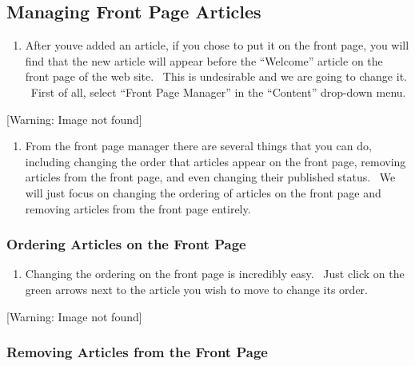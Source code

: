 \documentclass[12pt,twoside]{article}
\newcounter{saveenum}
\newcommand\liststyleLiii{%
\renewcommand\theenumi{\arabic{enumi}}
\renewcommand\theenumii{\arabic{enumii}}
\renewcommand\theenumiii{\arabic{enumiii}}
\renewcommand\theenumiv{\arabic{enumiv}}
\renewcommand\labelenumi{3.\theenumi)}
\renewcommand\labelenumii{\theenumii.}
\renewcommand\labelenumiii{\theenumiii.}
\renewcommand\labelenumiv{\theenumiv.}
}
\newcommand\liststyleLiv{%
\renewcommand\theenumi{\arabic{enumi}}
\renewcommand\theenumii{\arabic{enumii}}
\renewcommand\theenumiii{\arabic{enumiii}}
\renewcommand\theenumiv{\arabic{enumiv}}
\renewcommand\labelenumi{3.\theenumi)}
\renewcommand\labelenumii{\theenumii.}
\renewcommand\labelenumiii{\theenumiii.}
\renewcommand\labelenumiv{\theenumiv.}
}
\begin{document}
\subsection{Managing Front Page Articles}

\bigskip

\liststyleLiii
\begin{enumerate}
\item {
After you{\textquotesingle}ve added an article, if you chose to put it
on the front page, you will find that the new article will appear
before the ``Welcome'' article on the front page of the web site.
\ This is undesirable and we are going to change it. \ First of all,
select ``Front Page Manager'' in the ``Content'' drop{}-down menu.}
\end{enumerate}
{\centering{}
 [Warning: Image not found] 
\par}

\liststyleLiii
\setcounter{saveenum}{\value{enumi}}
\begin{enumerate}
\setcounter{enumi}{\value{saveenum}}
\item {
From the front page manager there are several things that you can do,
including changing the order that articles appear on the front page,
removing articles from the front page, and even changing their
published status. \ We will just focus on changing the ordering of
articles on the front page and removing articles from the front page
entirely.}
\end{enumerate}
\subsubsection{Ordering Articles on the Front Page}

\bigskip

\liststyleLiv
\begin{enumerate}
\item {
Changing the ordering on the front page is incredibly easy. \ Just click
on the green arrows next to the article you wish to move to change its
order.}
\end{enumerate}
{\centering{}
 [Warning: Image not found] 
\par}

\subsubsection{Removing Articles from the Front Page}
\end{document}

